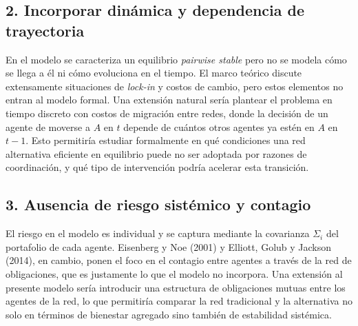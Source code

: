 \documentclass[12pt,a4paper]{article}
\begin{document}
\subsection*{2. Incorporar dinámica y dependencia de trayectoria}

En el modelo se caracteriza un equilibrio \textit{pairwise stable} pero no se modela cómo se
llega a él ni cómo evoluciona en el tiempo. El marco teórico discute extensamente situaciones
de \textit{lock-in} y costos de cambio, pero estos elementos no entran al modelo formal. Una
extensión natural sería plantear el problema en tiempo discreto con costos de migración entre
redes, donde la decisión de un agente de moverse a $A$ en $t$ depende de cuántos otros
agentes ya estén en $A$ en $t-1$. Esto permitiría estudiar formalmente en qué condiciones una
red alternativa eficiente en equilibrio puede no ser adoptada por razones de coordinación, y
qué tipo de intervención podría acelerar esta transición.

\subsection*{3. Ausencia de riesgo sistémico y contagio}

El riesgo en el modelo es individual y se captura mediante la covarianza $\Sigma_i$ del portafolio
de cada agente. Eisenberg y Noe (2001) y Elliott, Golub y Jackson (2014), en cambio, ponen el
foco en el contagio entre agentes a través de la red de obligaciones, que es justamente lo que
el modelo no incorpora. Una extensión al presente modelo sería introducir una estructura de
obligaciones mutuas entre los agentes de la red, lo que permitiría comparar la red tradicional
y la alternativa no solo en términos de bienestar agregado sino también de estabilidad
sistémica.
\end{document}
